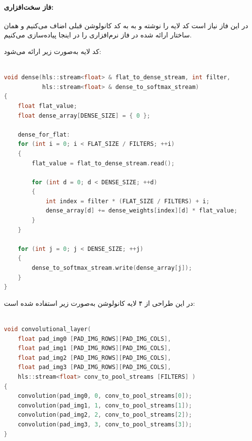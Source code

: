 \begin{qsolve}
	\paragraph{فاز سخت‌افزاری:}
	
	در این فاز نیاز است کد لایه  را نوشته و به به کد کانولوشن قبلی اضاف می‌کنیم و همان ساختار ارائه شده در فاز نرم‌افزاری را در اینجا پیاده‌سازی می‌کنیم.
	
	کد لایه  به‌صورت زیر ارائه می‌شود:
\end{qsolve}


\begin{latin}
\begin{lstlisting}[language=C,caption={HLS Implementation of Dense Layer}]
	
void dense(hls::stream<float> & flat_to_dense_stream, int filter,
		   hls::stream<float> & dense_to_softmax_stream)
{
	float flat_value;
	float dense_array[DENSE_SIZE] = { 0 };
	
	dense_for_flat:
	for (int i = 0; i < FLAT_SIZE / FILTERS; ++i)
	{
		flat_value = flat_to_dense_stream.read();
		
		for (int d = 0; d < DENSE_SIZE; ++d)
		{
			int index = filter * (FLAT_SIZE / FILTERS) + i;
			dense_array[d] += dense_weights[index][d] * flat_value;
		}
	}
	
	for (int j = 0; j < DENSE_SIZE; ++j)
	{
		dense_to_softmax_stream.write(dense_array[j]);
	}
}

\end{lstlisting}
\end{latin}



\begin{qsolve}
	در این طراحی از ۴ لایه کانولوشن به‌صورت زیر استفاده شده است:
\end{qsolve}



\begin{latin}
\begin{lstlisting}[language=C,caption={HLS Implementation of Convolution Layers}]

void convolutional_layer(
	float pad_img0 [PAD_IMG_ROWS][PAD_IMG_COLS],
	float pad_img1 [PAD_IMG_ROWS][PAD_IMG_COLS],
	float pad_img2 [PAD_IMG_ROWS][PAD_IMG_COLS],
	float pad_img3 [PAD_IMG_ROWS][PAD_IMG_COLS],
	hls::stream<float> conv_to_pool_streams [FILTERS] )
{
	convolution(pad_img0, 0, conv_to_pool_streams[0]);
	convolution(pad_img1, 1, conv_to_pool_streams[1]);
	convolution(pad_img2, 2, conv_to_pool_streams[2]);
	convolution(pad_img3, 3, conv_to_pool_streams[3]);
}
	
\end{lstlisting}
\end{latin}



